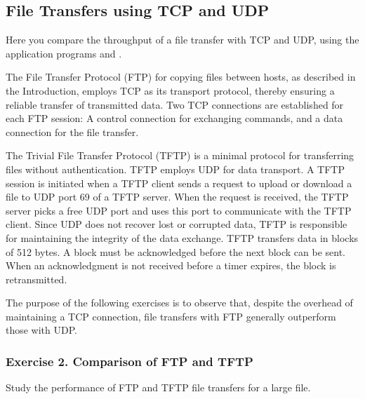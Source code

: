 \newpage
\subsection{File Transfers using TCP and UDP}

Here you compare the throughput of a file transfer with TCP and UDP, using the application programs  and .

The File Transfer Protocol (FTP) for copying files between hosts, as described in the Introduction, employs TCP as its transport protocol, thereby ensuring a reliable transfer of transmitted data. Two TCP connections are established for each FTP session: A control connection for exchanging commands, and a data connection for the file transfer.

The Trivial File Transfer Protocol (TFTP) is a minimal protocol for transferring files without authentication. TFTP employs UDP for data transport. A TFTP session is initiated when a TFTP client sends a request to upload or download a file to UDP port 69 of a TFTP server. When the request is received, the TFTP server picks a free UDP port and uses this port to communicate with the TFTP client. Since UDP does not recover lost or corrupted data, TFTP is responsible for maintaining the integrity of the data exchange. TFTP transfers data in blocks of 512 bytes. A block must be acknowledged before the next block can be sent. When an acknowledgment is not received before a timer expires, the block is retransmitted.

The purpose of the following exercises is to observe that, despite the overhead of maintaining a TCP connection, file transfers with FTP generally outperform those with UDP.

\subsubsection{Exercise 2. Comparison of FTP and TFTP}
Study the performance of FTP and TFTP file transfers for a large file.

